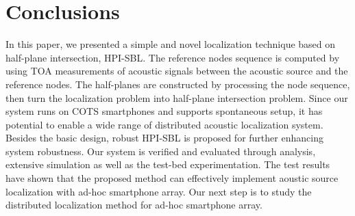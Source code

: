
\section{Conclusions}

In this paper, we presented a simple and novel localization technique based on half-plane intersection, HPI-SBL. 
The reference nodes sequence is computed by using TOA measurements of acoustic signals between the acoustic source and the reference nodes.
The half-planes are constructed by processing the node sequence, then turn the localization problem into half-plane intersection problem. 
Since our system runs on COTS smartphones and supports spontaneous setup, 
it has potential to enable a wide range of distributed acoustic localization system. 
 Besides the basic design,  robust HPI-SBL is proposed for further enhancing system robustness.
 Our system is verified and evaluated through analysis, extensive simulation as well as the test-bed experimentation.
 The test results have shown that the proposed method can effectively implement aoustic source localization with ad-hoc smartphone array.
 Our next step is to study the distributed localization method for ad-hoc smartphone array.




